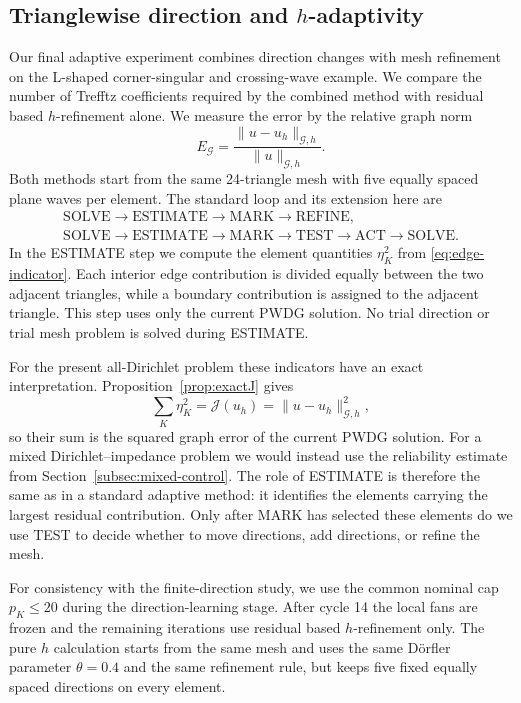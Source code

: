 \documentclass[pdflatex,sn-mathphys-num]{sn-jnl}
\theoremstyle{thmstyleone}
\theoremstyle{thmstyletwo}
\begin{document}
\subsection{Trianglewise direction and \texorpdfstring{$h$}{h}-adaptivity}\label{subsec:hybrid-adapt}
Our final adaptive experiment combines direction changes with mesh refinement on the L-shaped corner-singular and crossing-wave example.  We compare the number of Trefftz coefficients required by the combined method with residual based $h$-refinement alone.  We measure the error by the relative graph norm
\[
 E_{\mathcal G}=
 \frac{\|u-u_h\|_{\mathcal G,h}}{\|u\|_{\mathcal G,h}}.
\]
Both methods start from the same 24-triangle mesh with five equally spaced plane waves per element.  The standard loop and its extension here are
\[
\begin{array}{c}
\text{SOLVE}\to\text{ESTIMATE}\to\text{MARK}\to\text{REFINE},\\[-1mm]
\text{SOLVE}\to\text{ESTIMATE}\to\text{MARK}\to\text{TEST}\to\text{ACT}\to\text{SOLVE}.
\end{array}
\]
In the ESTIMATE step we compute the element quantities $\eta_K^2$ from \eqref{eq:edge-indicator}.  Each interior edge contribution is divided equally between the two adjacent triangles, while a boundary contribution is assigned to the adjacent triangle.  This step uses only the current PWDG solution.  No trial direction or trial mesh problem is solved during ESTIMATE.

For the present all-Dirichlet problem these indicators have an exact interpretation.  Proposition~\ref{prop:exactJ} gives
\[
 \sum_K\eta_K^2=\mathcal J(u_h)=\|u-u_h\|_{\mathcal G,h}^2,
\]
so their sum is the squared graph error of the current PWDG solution.  For a mixed Dirichlet--impedance problem we would instead use the reliability estimate from Section~\ref{subsec:mixed-control}.  The role of ESTIMATE is therefore the same as in a standard adaptive method: it identifies the elements carrying the largest residual contribution.  Only after MARK has selected these elements do we use TEST to decide whether to move directions, add directions, or refine the mesh.

For consistency with the finite-direction study, we use the common nominal cap $p_K\le20$ during the direction-learning stage.  After cycle 14 the local fans are frozen and the remaining iterations use residual based $h$-refinement only.  The pure $h$ calculation starts from the same mesh and uses the same D\"orfler parameter $\theta=0.4$ and the same refinement rule, but keeps five fixed equally spaced directions on every element.
\end{document}
